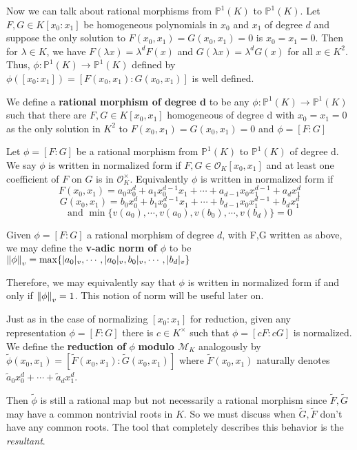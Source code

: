 \documentclass[12pt]{amsart}
\theoremstyle{definition}
\theoremstyle{remark}
\theoremstyle{definition}
\newcommand{\MCM}{\mathcal{M}}
\newcommand{\MCO}{\mathcal{O}}
\begin{document}
Now we can talk about rational morphisms from $\mathbb{P}^1(K)$ to $\mathbb{P}^1(K)$.   Let $F,G \in K[x_0: x_1]$ be  homogeneous polynomials in $x_0$ and $x_1$ of degree $d$ and suppose the only solution to  $F(x_0,x_1)=G(x_0,x_1)=0$ is $x_0=x_1=0$. Then for $\lambda \in K$, we have $F(\lambda x)=\lambda^dF(x)$ and $G(\lambda x)=\lambda^dG(x)$ for all $x \in K^2$. 
Thus, $\phi: \mathbb{P}^1(K) \rightarrow \mathbb{P}^1(K)$ defined by $\phi([x_0: x_1])=[F(x_0,x_1): G(x_0,x_1)]$ is well defined. 

We define a \textbf{rational morphism of degree d} to be any $\phi:\mathbb{P}^1(K) \rightarrow \mathbb{P}^1(K)$ such that there are $F,G \in K[x_0,x_1]$ homogeneous of degree d with $x_0=x_1=0$ as the only solution in $K^2$ to $F(x_0,x_1)=G(x_0,x_1)=0$ and $\phi = [F:G]$

Let $\phi=[F:G]$ be a rational morphism from $\mathbb{P}^1(K)$ to $\mathbb{P}^1(K)$ of degree d. We say $\phi$ is written in normalized form if $F,G \in \MCO_K[x_0,x_1]$ and at least one coefficient of $F$ on $G$ is in $\MCO_K^{\times}$. Equivalently $\phi$ is written in normalized form if \[F(x_0,x_1)=a_0x_0^d+a_1x_0^{d-1}x_1 + \cdots + a_{d-1}x_0x_1^{d-1}+a_dx_1^d\] \[G(x_0,x_1)=b_0x_0^d + b_1x_0^{d-1}x_1 + \cdots + b_{d-1}x_0x_1^{d-1}+b_dx_1^d\] \[ \text{and }\min\{v(a_0), \cdots, v(a_0), v(b_0), \cdots, v(b_d)\}=0\]

Given $\phi = [F:G]$ a rational morphism of degree $d$, with F,G written as above, we may define the \textbf{v-adic norm of $\phi$} to be $\norm{\phi}_v = \max\{|a_0|_v, \cdots, |a_0|_v, b_0|_v, \cdots, |b_d|_v\}$

Therefore, we may equivalently say that $\phi$ is written in normalized form if and only if $\norm{\phi}_v = 1$. This notion of norm will be useful later on.

Just as in the case of normalizing $[x_0:x_1]$ for reduction, given any representation $\phi =[F:G]$ there is $c \in K^{\times}$ such that $\phi=[cF:cG]$ is normalized.  We define the \textbf{reduction of} $\phi$ \textbf{ modulo $\MCM_K$} analogously by $\tilde{\phi}(x_0, x_1)=[\tilde{F}(x_0,x_1): \tilde{G}(x_0,x_1)]$ where $\tilde{F}(x_0,x_1)$ naturally denotes $\tilde{a}_0x_0^d + \cdots +\tilde{a}_dx_1^d$. 
 
Then $\tilde{\phi}$ is still a rational map but not necessarily a rational morphism since $\tilde{F}, \tilde{G}$ may have a common nontrivial roots in $K$.  So we must discuss when $\tilde{G}, \tilde{F}$ don't have any common roots. The tool that completely describes this behavior is the \emph{resultant}. 
 
\end{document}
